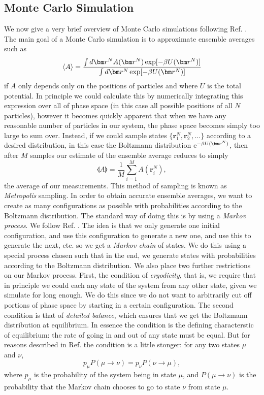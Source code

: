 \documentclass[thesis]{subfiles}
\begin{document}
\subsection{Monte Carlo Simulation}\label{subsec:MCsim}

We now give a very brief overview of Monte Carlo simulations following Ref. \cite{dijkstra2018modsim}.
The main goal of a Monte Carlo simulation is to approximate ensemble averages such as
\begin{equation}
	\llangle A \rrangle = \frac{\int d\bm r^N A\argr \exp[-\beta U\argr]}{\int d\bm r^N \exp[-\beta U\argr]}
\end{equation}
if $A$ only depends only on the positions of particles and where $U$ is the total potential. In principle we could calculate this by numerically integrating this expression over all of phase space (in this case all possible positions of all $N$ particles), however it becomes quickly apparent that when we have any reasonable number of particles in our system, the phase space becomes simply too large to sum over. Instead, if we could sample states $\{\bm r^N_1, \bm r^N_2, \ldots \}$ according to a desired distribution, in this case the Boltzmann distribution $\me^{-\beta U\argr}$, then after $M$ samples our estimate of the ensemble average reduces to simply
\begin{equation}
	\llangle A \rrangle = \frac{1}{M}\sum_{i=1}^M A(\bm r^N_i),
\end{equation}
the average of our measurements. This method of sampling is known as \emph{Metropolis} sampling. In order to obtain accurate ensemble averages, we want to create as many configurations as possible with probabilities according to the Boltzmann distribution. The standard way of doing this is by using a \emph{Markov process}. We follow Ref. \cite{newman1999monte}. The idea is that we only generate one initial configuration, and use this configuration to generate a new one, and use this to generate the next, etc. so we get a \emph{Markov chain} of states. We do this using a special process chosen such that in the end, we generate states with probabilities according to the Boltzmann distribution. We also place two further restrictions on our Markov process. First, the condition of \emph{ergodicity}, that is, we require that in principle we could each any state of the system from any other state, given we simulate for long enough. We do this since we do not want to arbitrarily cut off portions of phase space by starting in a certain configuration. The second condition is that of \emph{detailed balance}, which ensures that we get the Boltzmann distribution at equilibrium. In essence the condition is the defining characterstic of equilibrium: the rate of going in and out of any state must be equal. But for reasons described in Ref. \cite{newman1999monte} the condition is a little stonger: for any two states $\mu$ and $\nu$, $$ p_\mu P(\mu \to \nu) = p_\nu P(\nu \to \mu), $$ where $p_\mu$ is the probability of the system being in state $\mu$, and $P(\mu \to \nu)$ is the probability that the Markov chain chooses to go to state $\nu$ from state $\mu$. 
\end{document}
